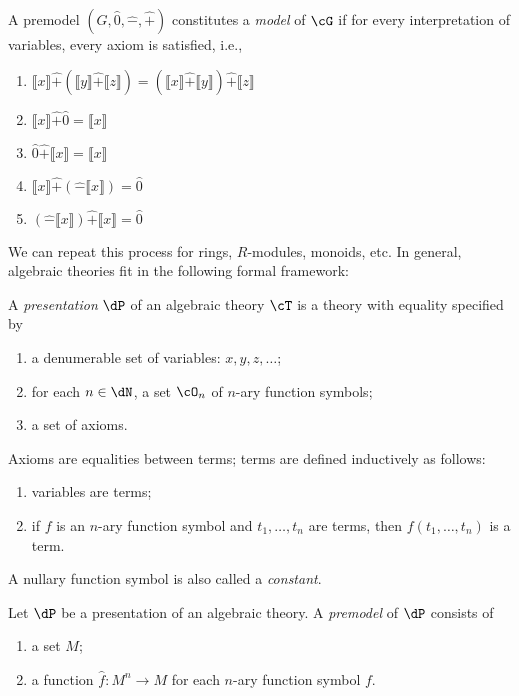 \documentclass{amsart}
\newcommand{\interp}[1]{\llbracket #1 \rrbracket}
\begin{document}
\begin{defn}
  A premodel $(G, \hat{0}, \hat{-}, \hat{+})$ constitutes a \emph{model} of $\cG$ if for every interpretation of variables, every axiom is satisfied, i.e.,
  \begin{enumerate}
  \item $\interp{x} \hat{+} (\interp{y} \hat{+} \interp{z}) = (\interp{x} \hat{+} \interp{y}) \hat{+} \interp{z}$
  \item $\interp{x} \hat{+} \hat{0} = \interp{x}$
  \item $\hat{0} \hat{+} \interp{x} = \interp{x}$
  \item $\interp{x} \hat{+} (\hat{-}\interp{x}) = \hat{0}$
  \item $(\hat{-}\interp{x}) \hat{+} \interp{x} = \hat{0}$
  \end{enumerate}
\end{defn}

We can repeat this process for rings, $R$-modules, monoids, etc.
In general, algebraic theories fit in the following formal framework:

\begin{defn}
  A \emph{presentation} $\dP$ of an algebraic theory $\cT$ is a theory with equality specified by
  \begin{enumerate}
  \item a denumerable set of variables: $x, y, z, \ldots$;
  \item for each $n \in \dN$, a set $\cO_{n}$ of $n$-ary function symbols;
  \item a set of axioms.
  \end{enumerate}
  Axioms are equalities between terms; terms are defined inductively as follows:
  \begin{enumerate}
  \item variables are terms;
  \item if $f$ is an $n$-ary function symbol and $t_{1},\ldots,t_{n}$ are terms, then $f(t_{1},\ldots,t_{n})$ is a term.
  \end{enumerate}
  A nullary function symbol is also called a \emph{constant}.
\end{defn}

\begin{defn}
  Let $\dP$ be a presentation of an algebraic theory.
  A \emph{premodel} of $\dP$ consists of
  \begin{enumerate}
  \item a set $M$;
  \item a function $\hat{f} : M^{n} \to M$ for each $n$-ary function symbol $f$.
  \end{enumerate}
\end{defn}
\end{document}
